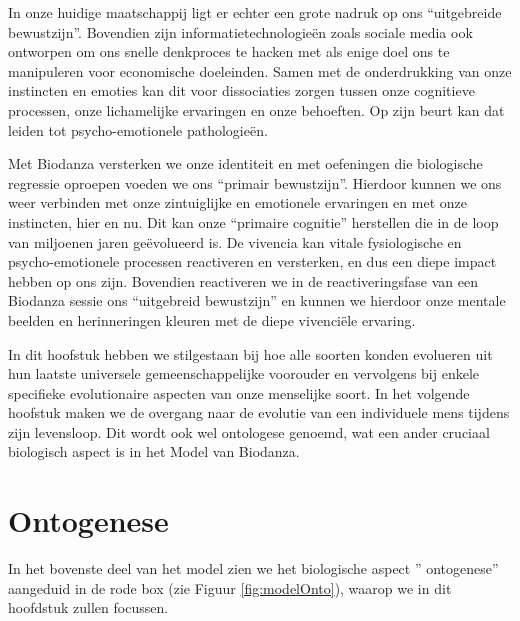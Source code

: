 \documentclass[
  11pt,
]{book}
\begin{document}
In onze huidige maatschappij ligt er echter een grote nadruk op ons ``uitgebreide bewustzijn''. Bovendien zijn informatietechnologieën zoals sociale media ook ontworpen om ons snelle denkproces te hacken met als enige doel ons te manipuleren voor economische doeleinden. Samen met de onderdrukking van onze instincten en emoties kan dit voor dissociaties zorgen tussen onze cognitieve processen, onze lichamelijke ervaringen en onze behoeften. Op zijn beurt kan dat leiden tot psycho-emotionele pathologieën.

Met Biodanza versterken we onze identiteit en met oefeningen die biologische regressie oproepen voeden we ons ``primair bewustzijn''.
Hierdoor kunnen we ons weer verbinden met onze zintuiglijke en emotionele ervaringen en met onze instincten, hier en nu. Dit kan onze ``primaire cognitie'' herstellen die in de loop van miljoenen jaren geëvolueerd is. De vivencia kan vitale fysiologische en psycho-emotionele processen reactiveren en versterken, en dus een diepe impact hebben op ons zijn. Bovendien reactiveren we in de reactiveringsfase van een Biodanza sessie ons ``uitgebreid bewustzijn'' en kunnen we hierdoor onze mentale beelden en herinneringen kleuren met de diepe vivenciële ervaring.

In dit hoofstuk hebben we stilgestaan bij hoe alle soorten konden evolueren uit hun laatste universele gemeenschappelijke voorouder en vervolgens bij enkele specifieke evolutionaire aspecten van onze menselijke soort.
In het volgende hoofstuk maken we de overgang naar de evolutie van een individuele mens tijdens zijn levensloop. Dit wordt ook wel ontologese genoemd, wat een ander cruciaal biologisch aspect is in het Model van Biodanza.

\hypertarget{ontogenese}{%
\chapter{Ontogenese}\label{ontogenese}}

In het bovenste deel van het model zien we het biologische aspect '' ontogenese'' aangeduid in de rode box (zie Figuur \ref{fig:modelOnto}), waarop we in dit hoofdstuk zullen focussen.
\end{document}
